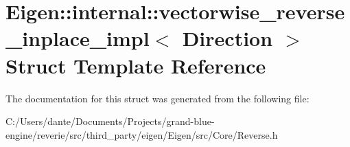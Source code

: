 \hypertarget{struct_eigen_1_1internal_1_1vectorwise__reverse__inplace__impl}{}\section{Eigen\+::internal\+::vectorwise\+\_\+reverse\+\_\+inplace\+\_\+impl$<$ Direction $>$ Struct Template Reference}
\label{struct_eigen_1_1internal_1_1vectorwise__reverse__inplace__impl}


The documentation for this struct was generated from the following file\+:\begin{DoxyCompactItemize}
\item 
C\+:/\+Users/dante/\+Documents/\+Projects/grand-\/blue-\/engine/reverie/src/third\+\_\+party/eigen/\+Eigen/src/\+Core/Reverse.\+h\end{DoxyCompactItemize}
